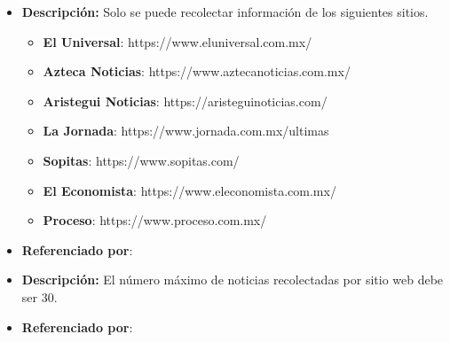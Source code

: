 \begin{itemize}
  \item \textbf{Descripción:} Solo se puede recolectar información de los siguientes sitios.\\

  \begin{itemize}

    \item \textbf{El Universal}: https://www.eluniversal.com.mx/
    \item \textbf{Azteca Noticias}: https://www.aztecanoticias.com.mx/
    \item \textbf{Aristegui Noticias}: https://aristeguinoticias.com/
    \item \textbf{La Jornada}: https://www.jornada.com.mx/ultimas
    \item \textbf{Sopitas}: https://www.sopitas.com/
    \item \textbf{El Economista}: https://www.eleconomista.com.mx/
    \item \textbf{Proceso}: https://www.proceso.com.mx/

  \end{itemize} 
  \item \textbf{Referenciado por}:  \\
\end{itemize}
%


\begin{itemize}
  \item \textbf{Descripción:} El número máximo de noticias recolectadas por sitio web debe ser 30.

  \item \textbf{Referenciado por}:  \\
\end{itemize}

